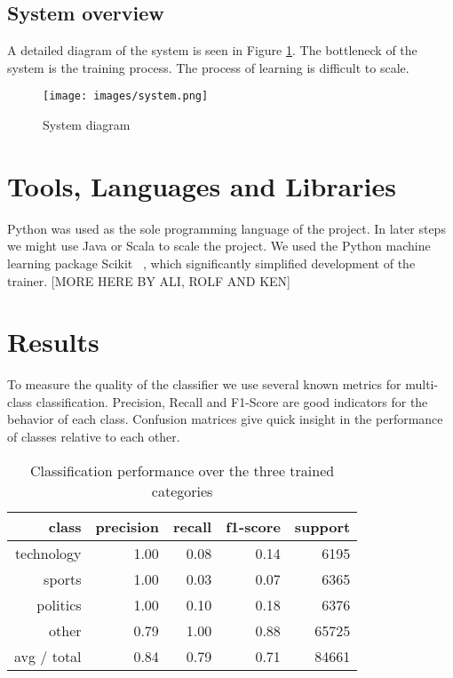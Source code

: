 \documentclass{llncs}
\begin{document}
\subsection{System overview}
A detailed diagram of the system is seen in Figure \ref{fig:System diagram}. The bottleneck of the system is the training process. The process of learning is difficult to scale.

\begin{figure}[H]
  \centering
  \texttt{[image: images/system.png]}
  \caption{System diagram}
  \label{fig:System diagram}
\end{figure}

\section{Tools, Languages and Libraries}
Python was used as the sole programming language of the project.
In later steps we might use Java or Scala to scale the project.
We used the Python machine learning package Scikit ~\cite{scikit-learn}, which significantly simplified development of the trainer. 
[MORE HERE BY ALI, ROLF AND KEN]

\section{Results}
To measure the quality of the classifier we use several known metrics for multi-class classification. Precision, Recall and F1-Score are good indicators for the behavior of each class. Confusion matrices give quick insight in the performance of classes relative to each other.

\begin{table}
\begin{center}
\begin{tabular}{|r|r|r|r|r|} \hline
class  & precision   & recall & f1-score  & support \\ \hline
 technology    &   1.00 &     0.08  &    0.14   &   6195 \\
     sports   &    1.00   &   0.03   &   0.07   &   6365 \\
   politics   &    1.00  &    0.10   &   0.18   &   6376 \\
      other   &    0.79 &     1.00  &    0.88   &  65725 \\ \hline
avg / total  &     0.84   &   0.79  &    0.71   &  84661 \\ \hline
\end{tabular}
\end{center}
\caption{Classification performance over the three trained categories}
\label{tbl:classification-report}
\end{table}
 
\end{document}
